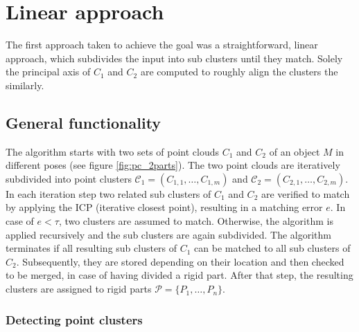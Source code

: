 \chapter{Linear approach}
\label{cha:LinearApproach}

The first approach taken to achieve the goal was a straightforward, linear approach, which subdivides the input into sub clusters until they match. Solely the principal axis of $C_1$ and $C_2$ are computed to roughly align the clusters the similarly. 

\section{General functionality}

The algorithm starts with two sets of point clouds $C_1$ and $C_2$ of an object $M$ in different poses (see figure \ref{fig:pc_2parts}). The two point clouds are iteratively subdivided into point clusters $\mathcal{C}_1 =  (C_{1,1},\ldots, C_{1,m})$ and $\mathcal{C}_2 =  (C_{2,1},\ldots, C_{2,m})$. In each iteration step two related sub clusters of $C_1$ and $C_2$ are verified to match by applying the ICP (iterative closest point), resulting in a matching error $e$. In case of $e < \tau$, two clusters are assumed to match. Otherwise, the algorithm is applied recursively and the sub clusters are again subdivided. The algorithm terminates if all resulting sub clusters of $C_1$ can be matched to all sub clusters of $C_2$. Subsequently, they are stored depending on their location and then checked to be merged, in case of having divided a rigid part. After that step, the resulting clusters are assigned to rigid parts $\mathcal{P} =  \{P_1,\ldots,P_n\}$.

\subsection{Detecting point clusters}

